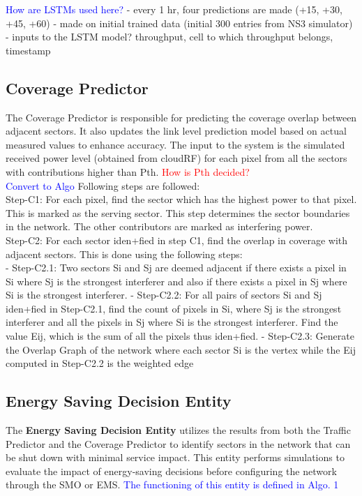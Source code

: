 \textcolor{blue}{How are LSTMs used here?}
- every 1 hr, four predictions are made (+15, +30, +45, +60)
- made on initial trained data (initial 300 entries from NS3 simulator) 
- inputs to the LSTM model? throughput, cell to which throughput belongs, timestamp 

\subsection{Coverage Predictor}

The Coverage Predictor is responsible for predicting the coverage overlap between adjacent sectors. It also updates the link level prediction model based on actual measured values to enhance accuracy. The input to the system is the simulated received power level (obtained from cloudRF) for each pixel from all the sectors with contributions higher than Pth. \textcolor{red}{How is Pth decided?} \\

\textcolor{blue}{Convert to Algo}
Following steps are followed: \\
Step-C1: For each pixel, find the sector which has the highest power to that pixel. This is marked as the serving sector. This step determines the sector boundaries in the network. The other contributors are marked as interfering power. \\
Step-C2: For each sector iden+fied in step C1, find the overlap in coverage with adjacent sectors. This is done using the following steps: \\
	- Step-C2.1: Two sectors Si and Sj are deemed adjacent if there exists a pixel in Si where Sj is the strongest interferer and also if there exists a pixel in Sj where Si is the strongest interferer.
	- Step-C2.2: For all pairs of sectors Si and Sj iden+fied in Step-C2.1, find the count of pixels in Si, where Sj is the strongest interferer and all the pixels in Sj where Si is the strongest interferer. Find the value Eij, which is the sum of all the pixels thus iden+fied.
	- Step-C2.3: Generate the Overlap Graph of the network where each sector Si is the vertex while the Eij computed in Step-C2.2 is the weighted edge

\subsection{Energy Saving Decision Entity}

The \textbf{Energy Saving Decision Entity} utilizes the results from both the Traffic Predictor and the Coverage Predictor to identify sectors in the network that can be shut down with minimal service impact. This entity performs simulations to evaluate the impact of energy-saving decisions before configuring the network through the SMO or EMS. \textcolor{blue}{The functioning of this entity is defined in Algo. 1}

